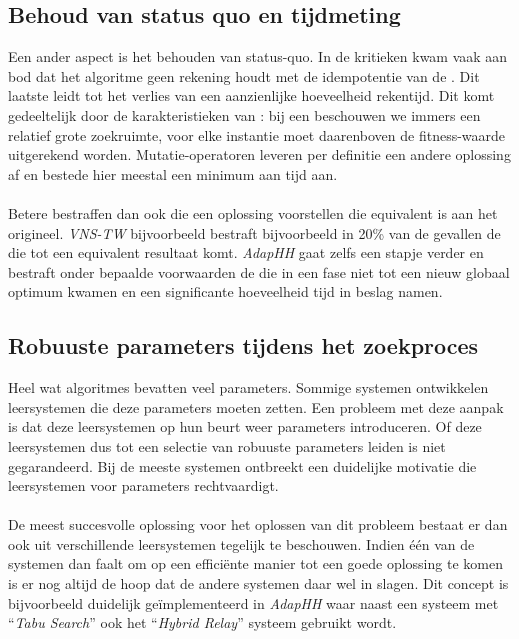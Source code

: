 \subsection{Behoud van status quo en tijdmeting}
Een ander aspect is het behouden van status-quo. In de kritieken kwam vaak aan bod dat het algoritme geen rekening houdt met de idempotentie van de \abls{} \abhn{}. Dit laatste leidt tot het verlies van een aanzienlijke hoeveelheid rekentijd. Dit komt gedeeltelijk door de karakteristieken van \abls{}: bij een \abls{} \abh{} beschouwen we immers een relatief grote zoekruimte, voor elke instantie moet daarenboven de fitness-waarde uitgerekend worden. Mutatie-operatoren leveren per definitie een andere oplossing af en bestede hier meestal een minimum aan tijd aan.

\paragraph{}
Betere \abhhn{} bestraffen dan ook \abhn{} die een oplossing voorstellen die equivalent is aan het origineel. \emph{VNS-TW} bijvoorbeeld bestraft bijvoorbeeld in 20\% van de gevallen de \abh{} die tot een equivalent resultaat komt. \emph{AdapHH} gaat zelfs een stapje verder en bestraft onder bepaalde voorwaarden de \abhn{} die in een fase niet tot een nieuw globaal optimum kwamen en een significante hoeveelheid tijd in beslag namen.

\subsection{Robuuste parameters tijdens het zoekproces}
Heel wat algoritmes bevatten veel parameters. Sommige systemen ontwikkelen leersystemen die deze parameters moeten zetten. Een probleem met deze aanpak is dat deze leersystemen op hun beurt weer parameters introduceren. Of deze leersystemen dus tot een selectie van robuuste parameters leiden is niet gegarandeerd. Bij de meeste systemen ontbreekt een duidelijke motivatie die leersystemen voor parameters rechtvaardigt.

\paragraph{}
De meest succesvolle oplossing voor het oplossen van dit probleem bestaat er dan ook uit verschillende leersystemen tegelijk te beschouwen. Indien \'e\'en van de systemen dan faalt om op een effici\"ente manier tot een goede oplossing te komen is er nog altijd de hoop dat de andere systemen daar wel in slagen. Dit concept is bijvoorbeeld duidelijk ge\"implementeerd in \emph{AdapHH} waar naast een systeem met ``\emph{Tabu Search}'' ook het ``\emph{Hybrid Relay}'' systeem gebruikt wordt.
